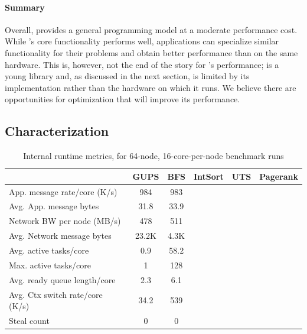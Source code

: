 \paragraph{Summary}

Overall, \Grappa provides a general programming model at a moderate
performance cost. While \Grappa's core functionality performs well,
applications can specialize similar functionality for their problems
and obtain better performance than \Grappa on the same hardware. This
is, however, not the end of the story for \Grappa's performance;
\Grappa is a young library and, as discussed in the next section, is
limited by its implementation rather than the hardware on which it
runs. We believe there are opportunities for optimization that will
improve its performance.

\subsection{Characterization}

\begin{table}[htb]
\small
\begin{center}
\setlength{\tabcolsep}{1pt}
\begin{tabular}{l|c|c|c|c|c}
                               &   GUPS            &   BFS   & IntSort & UTS & Pagerank \\ \hline
App. message rate/core (K/s)  & 984            &  983   &      &     \\
Avg. App. message bytes & 31.8              & 33.9    &      & \\
Network BW per node (MB/s)    & 478           & 511 &    &      \\
Avg. Network message bytes     & 23.2K             & 4.3K    & &    \\ \hline
Avg. active tasks/core         & 0.9               & 58.2    &  &  \\
Max. active tasks/core         & 1                 & 128     &  &   \\
Avg. ready queue length/core   & 2.3               & 6.1     &  &    \\
Avg. Ctx switch rate/core (K/s) & 34.2           & 539  &     &  \\ 
Steal count                    & 0                 & 0       &  &     \\
\end{tabular}
\end{center}
\caption{Internal runtime metrics, for 64-node, 16-core-per-node benchmark runs}
\label{tab:grappa-metrics}
\end{table}

